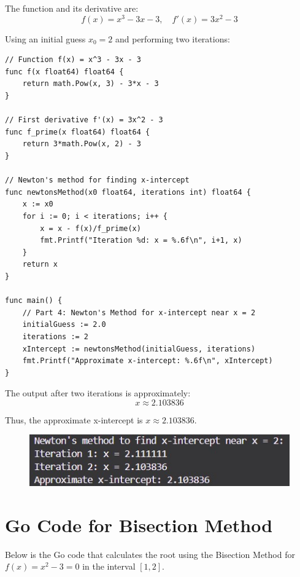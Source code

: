 \documentclass[11pt]{article}
\begin{document}
The function and its derivative are:
\[
f(x) = x^3 - 3x - 3, \quad f'(x) = 3x^2 - 3
\]

Using an initial guess \( x_0 = 2 \) and performing two iterations:

\begin{verbatim}
// Function f(x) = x^3 - 3x - 3
func f(x float64) float64 {
    return math.Pow(x, 3) - 3*x - 3
}

// First derivative f'(x) = 3x^2 - 3
func f_prime(x float64) float64 {
    return 3*math.Pow(x, 2) - 3
}

// Newton's method for finding x-intercept
func newtonsMethod(x0 float64, iterations int) float64 {
    x := x0
    for i := 0; i < iterations; i++ {
        x = x - f(x)/f_prime(x)
        fmt.Printf("Iteration %d: x = %.6f\n", i+1, x)
    }
    return x
}

func main() {
    // Part 4: Newton's Method for x-intercept near x = 2
    initialGuess := 2.0
    iterations := 2
    xIntercept := newtonsMethod(initialGuess, iterations)
    fmt.Printf("Approximate x-intercept: %.6f\n", xIntercept)
}
\end{verbatim}

The output after two iterations is approximately:
\[
x \approx 2.103836
\]

Thus, the approximate x-intercept is \( x \approx 2.103836 \).

\begin{figure}[!ht]
    \centering
    \includegraphics[width= 1 \textwidth]{images/prob_5.jpg}
    \label{fig:1}
  \end{figure}
  \FloatBarrier

  \section{Go Code for Bisection Method}

Below is the Go code that calculates the root using the Bisection Method for \( f(x) = x^2 - 3 = 0 \) in the interval \( [1, 2] \).
\end{document}
